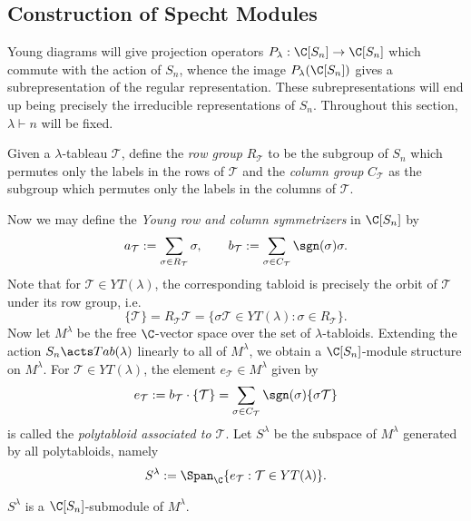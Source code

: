 \documentclass[../main.tex]{subfiles}
\begin{document}


\subsection{Construction of Specht Modules}
Young diagrams will give projection operators $ P_{\lambda}:\C[S_{n}]\to\C[S_{n}] $ which commute with the action of $ S_{n} $, whence the image $ P_{\lambda}(\C[S_{n}]) $ gives a subrepresentation of the regular representation. These subrepresentations will end up being precisely the irreducible representations of $ S_{n} $. Throughout this section, $ \lambda\vdash n$ will be fixed.\\

\begin{definition}\label{def:rowandcolgroup}
  Given a $ \lambda $-tableau $ \mathcal{T} $, define the \textit{row group} $ R_{\mathcal{T}} $ to be the subgroup of $ S_{n} $ which permutes only the labels in the rows of $ \mathcal{T} $ and the \textit{column group} $ C_{\mathcal{T}} $ as the subgroup which permutes only the labels in the columns of $ \mathcal{T} $. 
\end{definition}
Now we may define the \textit{Young row and column symmetrizers} in $ \C[S_{n}] $ by
\begin{equation}\label{eq:rowandcolsymm}
  a_{\mathcal{T}} := \sum_{\sigma\in R_{\mathcal{T}}} \sigma, \qquad b_{\mathcal{T}} := \sum_{\sigma\in C_{\mathcal{T}}} \sgn(\sigma) \sigma.
\end{equation}
Note that for $ \mathcal{T}\in YT(\lambda) $, the corresponding tabloid is precisely the orbit of $ \mathcal{T} $ under its row group, i.e. 
\[
  \{\mathcal{T}\} = R_{\mathcal{T}}\mathcal{T} = \{\sigma \mathcal{T}\in YT(\lambda) : \sigma\in R_{\mathcal{T}}\}.
\]
Now let $ M^{\lambda} $ be the free $ \C $-vector space over the set of $ \lambda $-tabloids. Extending the action $ S_{n}\acts Tab(\lambda) $ linearly to all of $ M^{\lambda} $, we obtain a $ \C[S_{n}] $-module structure on $ M^{\lambda} $. For $ \mathcal{T}\in YT(\lambda) $, the element $ e_{\mathcal{T}}\in M^{\lambda} $ given by
\[
  e_{\mathcal{T}} := b_{\mathcal{T}}\cdot \{\mathcal{T}\} = \sum_{\sigma\in C_{\mathcal{T}}} \sgn(\sigma) \{\sigma \mathcal{T}\}
\]
is called the \textit{polytabloid associated to $\mathcal{T}$}.
Let $ S^{\lambda} $ be the subspace of $ M^{\lambda} $ generated by all polytabloids, namely
\[
  S^{\lambda}:=\Span_{\C}\{e_{\mathcal{T}} : \mathcal{T}\in YT(\lambda)\}.
\]
\begin{claim}
  $ S^{\lambda} $ is a $ \C[S_{n}] $-submodule of $ M^{\lambda} $.
\end{claim}
\end{document}
